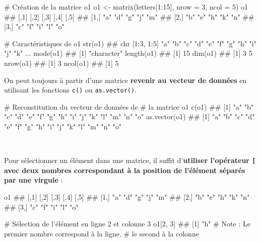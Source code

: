 \documentclass[12pt,twosided, notitlepage]{book}
\newenvironment{Shaded}{}{}
\newcommand{\KeywordTok}[1]{\textcolor[rgb]{0.00,0.00,1.00}{#1}}
\newcommand{\DataTypeTok}[1]{#1}
\newcommand{\DecValTok}[1]{#1}
\newcommand{\StringTok}[1]{\textcolor[rgb]{0.00,0.50,0.50}{#1}}
\newcommand{\CommentTok}[1]{\textcolor[rgb]{0.00,0.50,0.00}{#1}}
\newcommand{\OperatorTok}[1]{#1}
\newcommand{\NormalTok}[1]{#1}
\renewenvironment{Shaded}{\begin{snugshade}}{\end{snugshade}}
\begin{document}
\begin{Shaded}
\begin{Highlighting}[]
\CommentTok{# Création de la matrice o1}
\NormalTok{o1 <-}\StringTok{ }\KeywordTok{matrix}\NormalTok{(letters[}\DecValTok{1}\OperatorTok{:}\DecValTok{15}\NormalTok{], }\DataTypeTok{nrow =} \DecValTok{3}\NormalTok{, }\DataTypeTok{ncol =} \DecValTok{5}\NormalTok{)}
\NormalTok{o1}
\NormalTok{  ##      [,1] [,2] [,3] [,4] [,5]}
\NormalTok{  ## [1,] "a"  "d"  "g"  "j"  "m" }
\NormalTok{  ## [2,] "b"  "e"  "h"  "k"  "n" }
\NormalTok{  ## [3,] "c"  "f"  "i"  "l"  "o"}

\CommentTok{# Caractéristiques de o1}
\KeywordTok{str}\NormalTok{(o1)}
\NormalTok{  ##  chr [1:3, 1:5] "a" "b" "c" "d" "e" "f" "g" "h" "i" "j" "k" ...}
\KeywordTok{mode}\NormalTok{(o1)}
\NormalTok{  ## [1] "character"}
\KeywordTok{length}\NormalTok{(o1)}
\NormalTok{  ## [1] 15}
\KeywordTok{dim}\NormalTok{(o1)}
\NormalTok{  ## [1] 3 5}
\KeywordTok{nrow}\NormalTok{(o1)}
\NormalTok{  ## [1] 3}
\KeywordTok{ncol}\NormalTok{(o1)}
\NormalTok{  ## [1] 5}
\end{Highlighting}
\end{Shaded}

On peut toujours à partir d'une matrice \textbf{revenir au vecteur de
données} en utilisant les fonctions \texttt{c()} ou
\texttt{as.vector()}.

\begin{Shaded}
\begin{Highlighting}[]
\CommentTok{# Reconstitution du vecteur de données de }
\CommentTok{# la matrice o1}
\KeywordTok{c}\NormalTok{(o1)}
\NormalTok{  ##  [1] "a" "b" "c" "d" "e" "f" "g" "h" "i" "j" "k" "l" "m" "n" "o"}
\KeywordTok{as.vector}\NormalTok{(o1)}
\NormalTok{  ##  [1] "a" "b" "c" "d" "e" "f" "g" "h" "i" "j" "k" "l" "m" "n" "o"}
\end{Highlighting}
\end{Shaded}

~

Pour sélectionner un élément dans une matrice, il suffit
d'\textbf{utiliser l'opérateur \texttt{{[}} avec deux nombres
correspondant à la position de l'élément séparés par une
virgule}\index{\texttt{[}|textbf} :

\begin{Shaded}
\begin{Highlighting}[]
\NormalTok{o1}
\NormalTok{  ##      [,1] [,2] [,3] [,4] [,5]}
\NormalTok{  ## [1,] "a"  "d"  "g"  "j"  "m" }
\NormalTok{  ## [2,] "b"  "e"  "h"  "k"  "n" }
\NormalTok{  ## [3,] "c"  "f"  "i"  "l"  "o"}

\CommentTok{# Sélection de l'élément en ligne 2 et colonne 3}
\NormalTok{o1[}\DecValTok{2}\NormalTok{, }\DecValTok{3}\NormalTok{]}
\NormalTok{  ## [1] "h"}
\CommentTok{# Note : Le premier nombre correspond à la ligne,}
\CommentTok{# le second à la colonne}
\end{Highlighting}
\end{Shaded}
\end{document}
